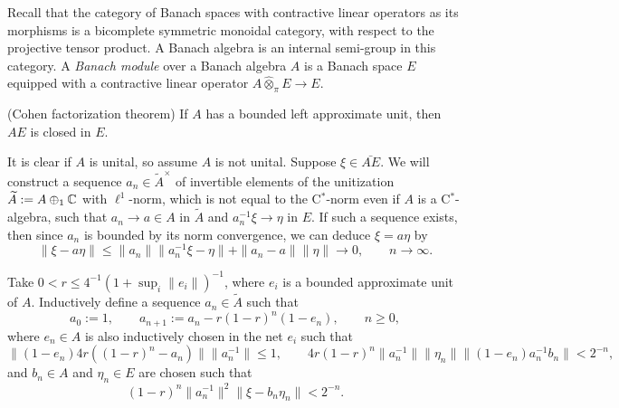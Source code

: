 \documentclass{../../large}
\begin{document}
\begin{prb}
Recall that the category of Banach spaces with contractive linear operators as its morphisms is a bicomplete symmetric monoidal category, with respect to the projective tensor product.
A Banach algebra is an internal semi-group in this category.
A \emph{Banach module} over a Banach algebra $A$ is a Banach space $E$ equipped with a contractive linear operator $A\mathrel{\hat\otimes_\pi} E\to E$.
\begin{parts}
\item (Cohen factorization theorem) If $A$ has a bounded left approximate unit, then $AE$ is closed in $E$.
\end{parts}
\end{prb}
\begin{pf}
It is clear if $A$ is unital, so assume $A$ is not unital.
Suppose $\xi\in\bar{AE}$.
We will construct a sequence $a_n\in\tilde A^\times$ of invertible elements of the unitization $\widetilde A:=A\oplus_1\mathbb{C}$ with $\ell^1$-norm, which is not equal to the C$^*$-norm even if $A$ is a C$^*$-algebra, such that $a_n\to a\in A$ in $\tilde A$ and $a_n^{-1}\xi\to\eta$ in $E$.
If such a sequence exists, then since $a_n$ is bounded by its norm convergence, we can deduce $\xi=a\eta$ by
\[\|\xi-a\eta\|\le\|a_n\|\|a_n^{-1}\xi-\eta\|+\|a_n-a\|\|\eta\|\to0,\qquad n\to\infty.\]

Take $0<r\le4^{-1}(1+\sup_i\|e_i\|)^{-1}$, where $e_i$ is a bounded approximate unit of $A$.
Inductively define a sequence $a_n\in\tilde A$ such that
\[a_0:=1,\qquad a_{n+1}:=a_n-r(1-r)^n(1-e_n),\qquad n\ge0,\]
where $e_n\in A$ is also inductively chosen in the net $e_i$ such that
\[\|(1-e_n)4r((1-r)^n-a_n)\|\|a_n^{-1}\|\le1,\qquad4r(1-r)^n\|a_n^{-1}\|\|\eta_n\|\|(1-e_n)a_n^{-1}b_n\|<2^{-n},\]
and $b_n\in A$ and $\eta_n\in E$ are chosen such that
\[(1-r)^n\|a_n^{-1}\|^2\|\xi-b_n\eta_n\|<2^{-n}.\]


\end{pf}
\end{document}
